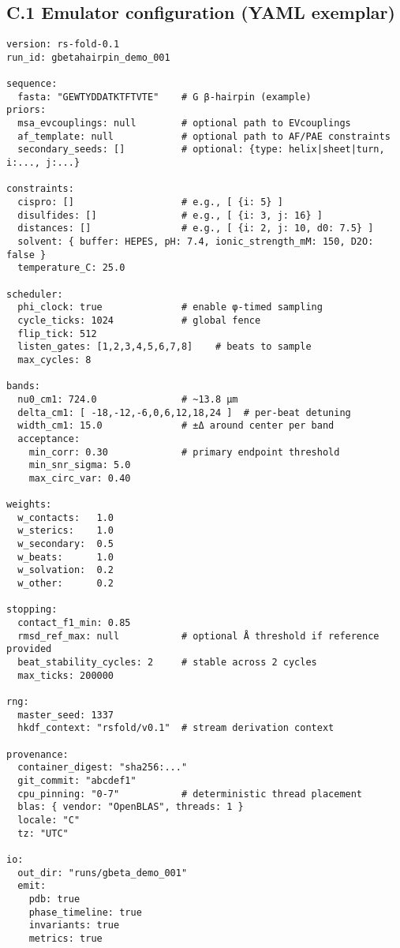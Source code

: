 \documentclass[12pt,a4paper]{article}
\begin{document}
\subsection*{C.1 Emulator configuration (YAML exemplar)}
\begin{verbatim}
version: rs-fold-0.1
run_id: gbetahairpin_demo_001

sequence:
  fasta: "GEWTYDDATKTFTVTE"    # G β-hairpin (example)
priors:
  msa_evcouplings: null        # optional path to EVcouplings
  af_template: null            # optional path to AF/PAE constraints
  secondary_seeds: []          # optional: {type: helix|sheet|turn, i:..., j:...}

constraints:
  cispro: []                   # e.g., [ {i: 5} ]
  disulfides: []               # e.g., [ {i: 3, j: 16} ]
  distances: []                # e.g., [ {i: 2, j: 10, d0: 7.5} ]
  solvent: { buffer: HEPES, pH: 7.4, ionic_strength_mM: 150, D2O: false }
  temperature_C: 25.0

scheduler:
  phi_clock: true              # enable φ-timed sampling
  cycle_ticks: 1024            # global fence
  flip_tick: 512
  listen_gates: [1,2,3,4,5,6,7,8]    # beats to sample
  max_cycles: 8

bands:
  nu0_cm1: 724.0               # ~13.8 μm
  delta_cm1: [ -18,-12,-6,0,6,12,18,24 ]  # per-beat detuning
  width_cm1: 15.0              # ±Δ around center per band
  acceptance:
    min_corr: 0.30             # primary endpoint threshold
    min_snr_sigma: 5.0
    max_circ_var: 0.40

weights:
  w_contacts:   1.0
  w_sterics:    1.0
  w_secondary:  0.5
  w_beats:      1.0
  w_solvation:  0.2
  w_other:      0.2

stopping:
  contact_f1_min: 0.85
  rmsd_ref_max: null           # optional Å threshold if reference provided
  beat_stability_cycles: 2     # stable across 2 cycles
  max_ticks: 200000

rng:
  master_seed: 1337
  hkdf_context: "rsfold/v0.1"  # stream derivation context

provenance:
  container_digest: "sha256:..."
  git_commit: "abcdef1"
  cpu_pinning: "0-7"           # deterministic thread placement
  blas: { vendor: "OpenBLAS", threads: 1 }
  locale: "C"
  tz: "UTC"

io:
  out_dir: "runs/gbeta_demo_001"
  emit:
    pdb: true
    phase_timeline: true
    invariants: true
    metrics: true
\end{verbatim}
\end{document}

